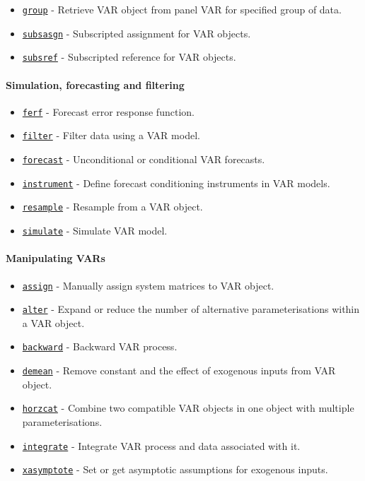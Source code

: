 \begin{itemize}
\itemsep1pt\parskip0pt
\item
  \href{VAR/group}{\texttt{group}} - Retrieve VAR object from panel VAR
  for specified group of data.
\item
  \href{VAR/subsasgn}{\texttt{subsasgn}} - Subscripted assignment for
  VAR objects.
\item
  \href{VAR/subsref}{\texttt{subsref}} - Subscripted reference for VAR
  objects.
\end{itemize}

\paragraph{Simulation, forecasting and
filtering}

\begin{itemize}
\itemsep1pt\parskip0pt
\item
  \href{VAR/ferf}{\texttt{ferf}} - Forecast error response function.
\item
  \href{VAR/filter}{\texttt{filter}} - Filter data using a VAR model.
\item
  \href{VAR/forecast}{\texttt{forecast}} - Unconditional or conditional
  VAR forecasts.
\item
  \href{VAR/instrument}{\texttt{instrument}} - Define forecast
  conditioning instruments in VAR models.
\item
  \href{VAR/resample}{\texttt{resample}} - Resample from a VAR object.
\item
  \href{VAR/simulate}{\texttt{simulate}} - Simulate VAR model.
\end{itemize}

\paragraph{Manipulating VARs}

\begin{itemize}
\itemsep1pt\parskip0pt
\item
  \href{VAR/assign}{\texttt{assign}} - Manually assign system matrices
  to VAR object.
\item
  \href{VAR/alter}{\texttt{alter}} - Expand or reduce the number of
  alternative parameterisations within a VAR object.
\item
  \href{VAR/backward}{\texttt{backward}} - Backward VAR process.
\item
  \href{VAR/demean}{\texttt{demean}} - Remove constant and the effect of
  exogenous inputs from VAR object.
\item
  \href{VAR/horzcat}{\texttt{horzcat}} - Combine two compatible VAR
  objects in one object with multiple parameterisations.
\item
  \href{VAR/integrate}{\texttt{integrate}} - Integrate VAR process and
  data associated with it.
\item
  \href{VAR/xasymptote}{\texttt{xasymptote}} - Set or get asymptotic
  assumptions for exogenous inputs.
\end{itemize}

